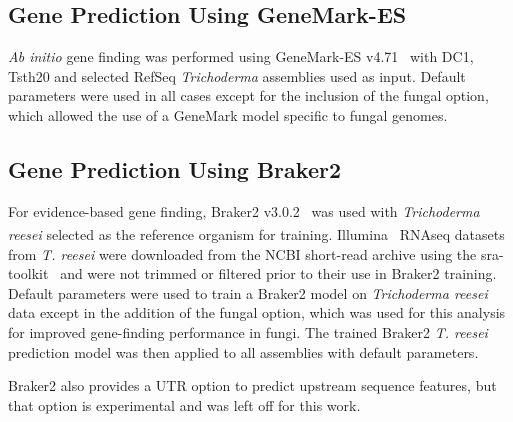 \subsection{Gene Prediction Using GeneMark-ES}
\label{met:genemark}


\textit{Ab initio} gene finding was performed using GeneMark-ES
v4.71~\cite{borodovsky2011a} with DC1, Tsth20 and selected RefSeq
\textit{Trichoderma} assemblies used as input. Default parameters were
used in all cases except for the inclusion of the fungal option, which allowed the use
of a GeneMark model specific to fungal genomes.

%

\subsection{Gene Prediction Using Braker2}
\label{met:braker2}

For evidence-based gene finding, Braker2 v3.0.2~\cite{bruna2021a} was
used with \textit{Trichoderma reesei} selected as the reference
organism for
training. Illumina\textsuperscript{\textcopyright}\texttrademark~\cite{bennett2004a}
RNAseq datasets from \textit{T. reesei} were downloaded from the NCBI
short-read archive using the sra-toolkit~\cite{zotero-item-326} and were not
trimmed or filtered prior to their use in Braker2 training. Default
parameters were used to train a Braker2 model on \textit{Trichoderma
  reesei} data except in the addition of the fungal option, which was used
for this analysis for improved gene-finding performance in fungi. The
trained Braker2 \textit{T. reesei} prediction model was then applied
to all assemblies with default parameters.

Braker2 also provides a UTR option to predict upstream sequence
features, but that option is experimental and was left off for this
work.


